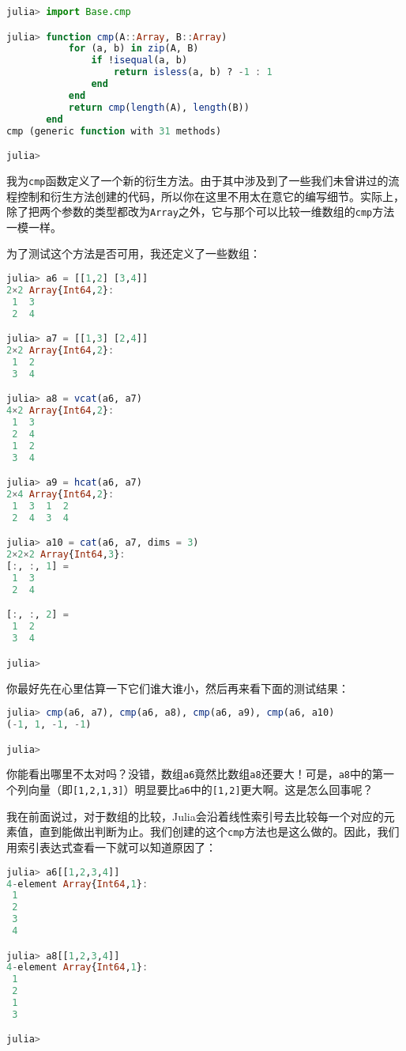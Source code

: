 \begin{lstlisting}[language=julia]
julia> import Base.cmp

julia> function cmp(A::Array, B::Array)
           for (a, b) in zip(A, B)
               if !isequal(a, b)
                   return isless(a, b) ? -1 : 1
               end
           end
           return cmp(length(A), length(B))
       end
cmp (generic function with 31 methods)

julia>
\end{lstlisting}

我为\verb|cmp|函数定义了一个新的衍生方法。由于其中涉及到了一些我们未曾讲过的流程控制和衍生方法创建的代码，所以你在这里不用太在意它的编写细节。实际上，除了把两个参数的类型都改为\verb|Array|之外，它与那个可以比较一维数组的\verb|cmp|方法一模一样。

为了测试这个方法是否可用，我还定义了一些数组：

\begin{lstlisting}[language=julia]
julia> a6 = [[1,2] [3,4]]
2×2 Array{Int64,2}:
 1  3
 2  4

julia> a7 = [[1,3] [2,4]]
2×2 Array{Int64,2}:
 1  2
 3  4

julia> a8 = vcat(a6, a7)
4×2 Array{Int64,2}:
 1  3
 2  4
 1  2
 3  4

julia> a9 = hcat(a6, a7)
2×4 Array{Int64,2}:
 1  3  1  2
 2  4  3  4

julia> a10 = cat(a6, a7, dims = 3)
2×2×2 Array{Int64,3}:
[:, :, 1] =
 1  3
 2  4

[:, :, 2] =
 1  2
 3  4

julia> 
\end{lstlisting}

你最好先在心里估算一下它们谁大谁小，然后再来看下面的测试结果：

\begin{lstlisting}[language=julia]
julia> cmp(a6, a7), cmp(a6, a8), cmp(a6, a9), cmp(a6, a10)
(-1, 1, -1, -1)

julia> 
\end{lstlisting}

你能看出哪里不太对吗？没错，数组\verb|a6|竟然比数组\verb|a8|还要大！可是，\verb|a8|中的第一个列向量（即\verb|[1,2,1,3]|）明显要比\verb|a6|中的\verb|[1,2]|更大啊。这是怎么回事呢？

我在前面说过，对于数组的比较，Julia会沿着线性索引号去比较每一个对应的元素值，直到能做出判断为止。我们创建的这个\verb|cmp|方法也是这么做的。因此，我们用索引表达式查看一下就可以知道原因了：

\begin{lstlisting}[language=julia]
julia> a6[[1,2,3,4]]
4-element Array{Int64,1}:
 1
 2
 3
 4

julia> a8[[1,2,3,4]]
4-element Array{Int64,1}:
 1
 2
 1
 3

julia>
\end{lstlisting}

